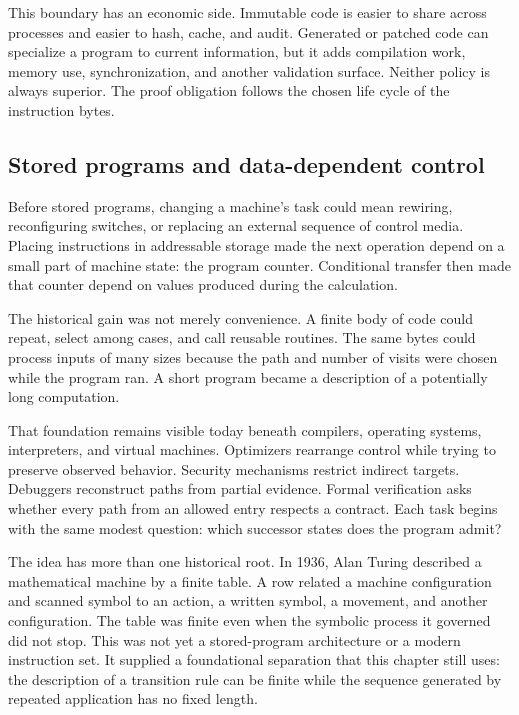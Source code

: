 This boundary has an economic side. Immutable code is easier to share across
processes and easier to hash, cache, and audit. Generated or patched code can
specialize a program to current information, but it adds compilation work,
memory use, synchronization, and another validation surface. Neither policy
is always superior. The proof obligation follows the chosen life cycle of the
instruction bytes.

\subsection{Stored programs and data-dependent control}

Before stored programs, changing a machine's task could mean rewiring,
reconfiguring switches, or replacing an external sequence of control media.
Placing instructions in addressable storage made the next operation depend on
a small part of machine state: the program counter. Conditional transfer then
made that counter depend on values produced during the calculation.

The historical gain was not merely convenience. A finite body of code could
repeat, select among cases, and call reusable routines. The same bytes could
process inputs of many sizes because the path and number of visits were chosen
while the program ran. A short program became a description of a potentially
long computation.

That foundation remains visible today beneath compilers, operating systems,
interpreters, and virtual machines. Optimizers rearrange control while trying
to preserve observed behavior. Security mechanisms restrict indirect targets.
Debuggers reconstruct paths from partial evidence. Formal verification asks
whether every path from an allowed entry respects a contract. Each task begins
with the same modest question: which successor states does the program admit?

The idea has more than one historical root. In 1936, Alan Turing described a
mathematical machine by a finite table. A row related a machine configuration
and scanned symbol to an action, a written symbol, a movement, and another
configuration. The table was finite even when the symbolic process it governed
did not stop. This was not yet a stored-program architecture or a modern
instruction set. It supplied a foundational separation that this chapter
still uses: the description of a transition rule can be finite while the
sequence generated by repeated application has no fixed length.
\autocite{turing1937computable}


